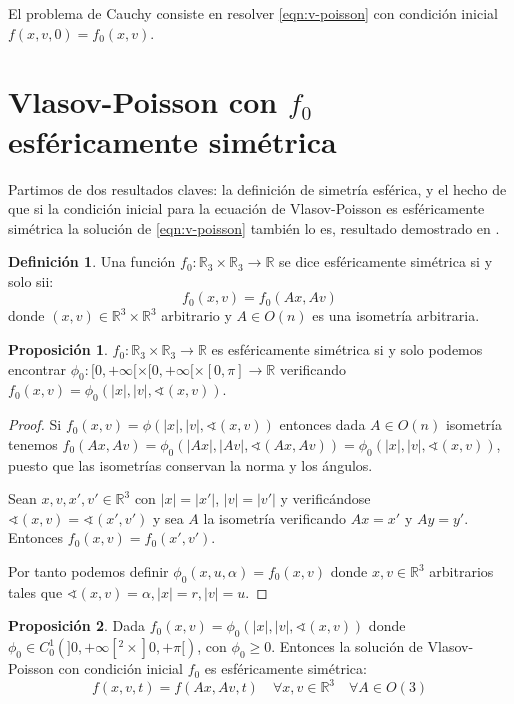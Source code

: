\documentclass[a4paper,10pt]{scrartcl}
\theoremstyle{definition}
\newtheorem*{definition}{Definición}
\newtheorem{fact}{Proposición}
\numberwithin{equation}{section}
\begin{document}
El problema de Cauchy consiste en resolver \eqref{eqn:v-poisson} con condición inicial $f(x,v,0) = f_0(x,v)$.

\newpage
\section{Vlasov-Poisson con $f_0$ esféricamente simétrica}
Partimos de dos resultados claves: la definición de simetría esférica, y el hecho de que si la condición inicial para la ecuación de Vlasov-Poisson es esféricamente simétrica la solución de \eqref{eqn:v-poisson} también lo es, resultado demostrado en \cite{Batt}.

\begin{definition}
 Una función $f_0:\mathbb{R}_3 \times \mathbb{R}_3 \rightarrow \mathbb{R}$ se dice esféricamente simétrica si y solo sii: 
 \[
 f_0(x,v) = f_0(Ax,Av)
 \] 
 donde $(x,v) \in \mathbb{R}^3\times \mathbb{R}^3$ arbitrario y $A\in O(n)$ es una isometría arbitraria.
\end{definition}

\begin{fact}
 $f_0:\mathbb{R}_3 \times \mathbb{R}_3  \rightarrow \mathbb{R}$ es esféricamente simétrica si y solo podemos encontrar $\phi_0:[0,+\infty[ \times [0,+\infty[ \times [0, \pi]  \rightarrow \mathbb{R}$ verificando $f_0(x,v) = \phi_0(|x|, |v|, \sphericalangle(x,v))$.
 \label{char:sph-symm}
\end{fact}

\begin{proof}

 Si $f_0(x,v) = \phi(|x|,|v|,\sphericalangle(x,v))$ entonces dada $A\in O(n)$ isometría tenemos $f_0(Ax, Av) = \phi_0(|Ax|, |Av|, \sphericalangle(Ax, Av)) = \phi_0(|x|, |v|, \sphericalangle(x,v))$, puesto que las isometrías conservan la norma y los ángulos.
 
 Sean $x,v,x',v'\in \mathbb{R}^3$ con $|x| = |x'|$, $|v| = |v'|$ y verificándose $\sphericalangle(x,v) = \sphericalangle(x',v')$ y sea $A$ la isometría verificando $Ax = x'$ y $Ay = y'$. Entonces $f_0(x,v) = f_0(x',v')$.
 
 Por tanto podemos definir $\phi_0(x,u,\alpha) = f_0(x,v)$ donde $x,v\in\mathbb{R}^3$ arbitrarios tales que $\sphericalangle(x,v) = \alpha, |x|=r, |v|=u$.
\end{proof}

\begin{fact}
Dada $f_0(x,v) = \phi_0(|x|, |v|, \sphericalangle(x,v))$ donde $\phi_0 \in C_0^1(]0,+\infty[^2 \times ]0,+\pi[)$, con $\phi_0\ge 0$. Entonces la solución de Vlasov-Poisson con condición inicial $f_0$ es esféricamente simétrica:
\begin{equation*}
f(x,v,t) = f(Ax, Av, t) \quad \forall x,v\in \mathbb{R}^3 \quad \forall A \in O(3)
\end{equation*}
\end{fact}
\end{document}
